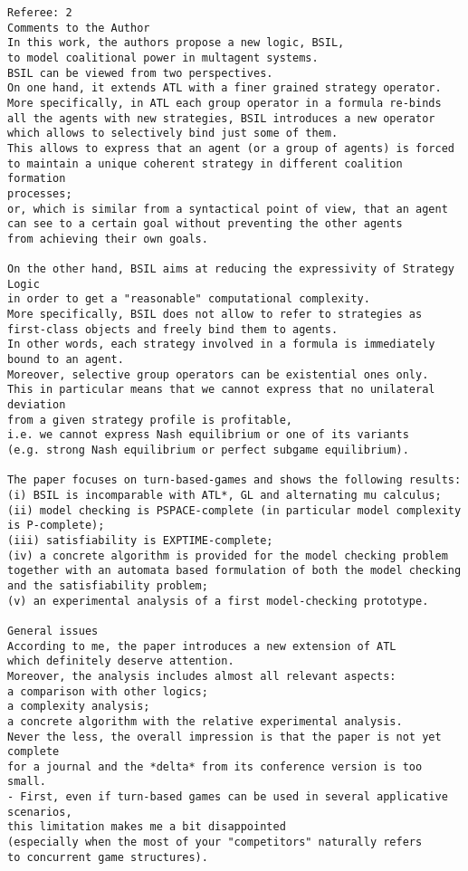 \documentclass[11pt]{article}
\begin{document}
\begin{verbatim} 
Referee: 2 
Comments to the Author 
In this work, the authors propose a new logic, BSIL, 
to model coalitional power in multagent systems. 
BSIL can be viewed from two perspectives. 
On one hand, it extends ATL with a finer grained strategy operator. 
More specifically, in ATL each group operator in a formula re-binds 
all the agents with new strategies, BSIL introduces a new operator 
which allows to selectively bind just some of them. 
This allows to express that an agent (or a group of agents) is forced 
to maintain a unique coherent strategy in different coalition formation 
processes; 
or, which is similar from a syntactical point of view, that an agent 
can see to a certain goal without preventing the other agents 
from achieving their own goals. 

On the other hand, BSIL aims at reducing the expressivity of Strategy Logic 
in order to get a "reasonable" computational complexity. 
More specifically, BSIL does not allow to refer to strategies as 
first-class objects and freely bind them to agents. 
In other words, each strategy involved in a formula is immediately 
bound to an agent. 
Moreover, selective group operators can be existential ones only. 
This in particular means that we cannot express that no unilateral deviation 
from a given strategy profile is profitable, 
i.e. we cannot express Nash equilibrium or one of its variants 
(e.g. strong Nash equilibrium or perfect subgame equilibrium). 

The paper focuses on turn-based-games and shows the following results: 
(i) BSIL is incomparable with ATL*, GL and alternating mu calculus; 
(ii) model checking is PSPACE-complete (in particular model complexity 
is P-complete); 
(iii) satisfiability is EXPTIME-complete; 
(iv) a concrete algorithm is provided for the model checking problem 
together with an automata based formulation of both the model checking 
and the satisfiability problem; 
(v) an experimental analysis of a first model-checking prototype. 

General issues 
According to me, the paper introduces a new extension of ATL 
which definitely deserve attention. 
Moreover, the analysis includes almost all relevant aspects: 
a comparison with other logics; 
a complexity analysis; 
a concrete algorithm with the relative experimental analysis. 
Never the less, the overall impression is that the paper is not yet complete 
for a journal and the *delta* from its conference version is too small. 
- First, even if turn-based games can be used in several applicative scenarios, 
this limitation makes me a bit disappointed 
(especially when the most of your "competitors" naturally refers 
to concurrent game structures). 
\end{verbatim} 
\end{document}
